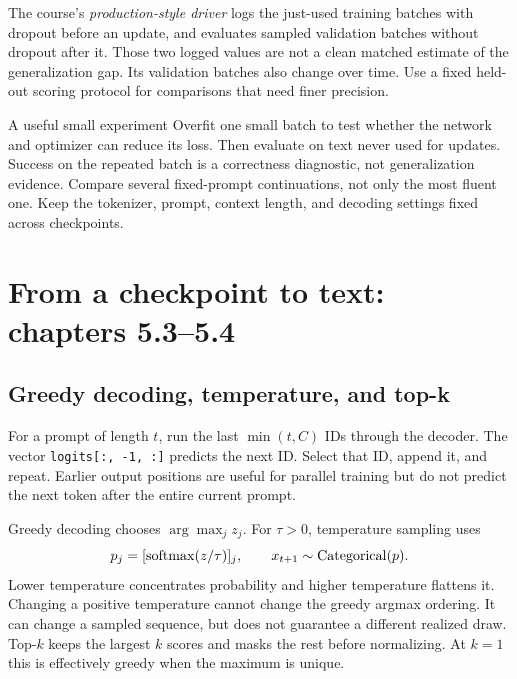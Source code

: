The course's \emph{production-style driver} logs the just-used training batches
with dropout before an update, and evaluates sampled validation batches without
dropout after it. Those two logged values are not a clean matched estimate of
the generalization gap. Its validation batches also change over time. Use a
fixed held-out scoring protocol for comparisons that need finer precision.

\begin{studybox}{A useful small experiment}
Overfit one small batch to test whether the network and optimizer can reduce
its loss. Then evaluate on text never used for updates. Success on the repeated
batch is a correctness diagnostic, not generalization evidence. Compare several
fixed-prompt continuations, not only the most fluent one. Keep the tokenizer,
prompt, context length, and decoding settings fixed across checkpoints.
\end{studybox}

\section{From a checkpoint to text: chapters 5.3--5.4}
\label{sec:book-generation}

\subsection{Greedy decoding, temperature, and top-k}
For a prompt of length $t$, run the last $\min(t,C)$ IDs through the decoder.
The vector \texttt{logits[:, -1, :]} predicts the next ID. Select that ID, append
it, and repeat. Earlier output positions are useful for parallel training but
do not predict the next token after the entire current prompt.

Greedy decoding chooses $\arg\max_j z_j$. For $\tau>0$, temperature sampling uses
\[
p_j=[\operatorname{softmax}(z/\tau)]_j,\qquad
x_{t+1}\sim\operatorname{Categorical}(p).
\]
Lower temperature concentrates probability and higher temperature flattens it.
Changing a positive temperature cannot change the greedy argmax ordering.
It can change a sampled sequence, but does not guarantee a different realized
draw. Top-$k$ keeps the largest $k$ scores and masks the rest before normalizing.
At $k=1$ this is effectively greedy when the maximum is unique.

